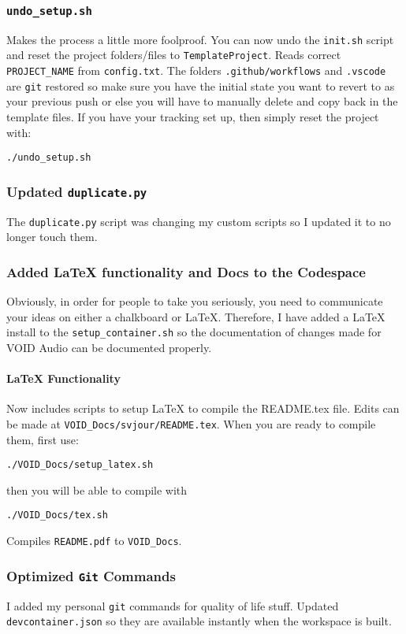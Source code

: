\documentclass[twocolumn,natbib]{svjour3}        %
\begin{document}
\subsubsection{\protect\texttt{undo\_setup.sh}}
Makes the process a little more foolproof. You can now undo the \texttt{init.sh} script and reset the project folders/files to \texttt{TemplateProject}. Reads correct \texttt{PROJECT\_NAME} from \texttt{config.txt}. The folders \texttt{.github/workflows} and \texttt{.vscode} are \texttt{git} restored so make sure you have the initial state you want to revert to as your previous push or else you will have to manually delete and copy back in the template files. If you have your tracking set up, then simply reset the project with:
\begin{lstlisting}
./undo_setup.sh
\end{lstlisting}
\subsubsection{Updated \texttt{duplicate.py}}
The \texttt{duplicate.py} script was changing my custom scripts so I updated it to no longer touch them.
\subsubsection{Added LaTeX functionality and Docs to the Codespace}
Obviously, in order for people to take you seriously, you need to communicate your ideas on either a chalkboard or LaTeX. Therefore, I have added a LaTeX install to the \texttt{setup\_container.sh} so the documentation of changes made for VOID Audio can be documented properly. 
\paragraph{LaTeX Functionality}
Now includes scripts to setup LaTeX to compile the README.tex file. Edits can be made at \texttt{VOID\_Docs/svjour/README.tex}. When you are ready to compile them, first use:
\begin{lstlisting}
./VOID_Docs/setup_latex.sh
\end{lstlisting}
then you will be able to compile with
\begin{lstlisting}
./VOID_Docs/tex.sh
\end{lstlisting}
Compiles \texttt{README.pdf} to \texttt{VOID\_Docs}.
\subsubsection{Optimized \texttt{Git} Commands}
I added my personal \texttt{git} commands for quality of life stuff. Updated \texttt{devcontainer.json} so they are available instantly when the workspace is built.
\end{document}
